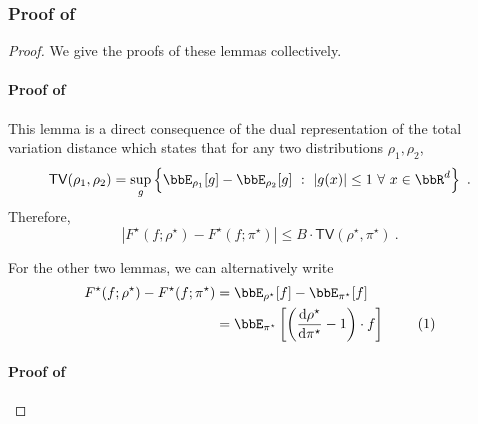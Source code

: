 \documentclass[11pt]{article}
\newcounter{ct}
\newcommand{\rmd}{\mathrm{d}}
\newcommand{\numberthis}{\addtocounter{equation}{1}\tag{\theequation}}
\begin{document}
\subsubsection{Proof of }
\label{sec:prf:bias-bounds}

\begin{proof}
We give the proofs of these lemmas collectively.
\paragraph{Proof of } This lemma is a direct consequence of the dual representation of the total variation distance which states that for any two distributions \(\rho_{1}, \rho_{2}\),
\begin{equation*}
    \mathsf{TV}(\rho_{1}, \rho_{2}) = \sup_{g} \left\{ \bbE_{\rho_{1}}[g] - \bbE_{\rho_{2}}[g] ~:~ |g(x)| \leq 1 ~\forall~ x \in \bbR^{d}\right\}~.
\end{equation*}
Therefore,
\begin{equation*}
    \left|F^{\star}(f; \rho^{\star}) - F^{\star}(f; \pi^{\star})\right| \leq B \cdot \mathsf{TV}(\rho^{\star}, \pi^{\star})~.
\end{equation*}

For the other two lemmas, we can alternatively write
\begin{align*}
    F^{\star}(f; \rho^{\star}) - F^{\star}(f; \pi^{\star}) &= \bbE_{\rho^{\star}}[f] - \bbE_{\pi^{\star}}[f] \\
    &= \bbE_{\pi^{\star}}\left[\left(\frac{\rmd \rho^{\star}}{\rmd \pi^{\star}} - 1\right) \cdot f\right]~\numberthis\label{eq:bias-relative-density}
\end{align*}
\paragraph{Proof of }


\end{proof}
\end{document}
